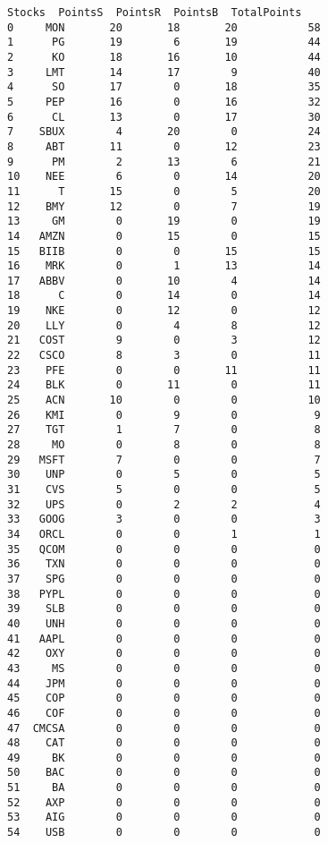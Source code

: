 \documentclass[11pt]{article}
\makeatletter
\newcommand{\boxspacing}{\kern\kvtcb@left@rule\kern\kvtcb@boxsep}
\newcommand{\prompt}[4]{
        {\ttfamily\llap{{\color{#2}[#3]:\hspace{3pt}#4}}\vspace{-\baselineskip}}
    }
\makeatother
\begin{document}
            \begin{tcolorbox}[breakable, size=fbox, boxrule=.5pt, pad at break*=1mm, opacityfill=0]
\prompt{Out}{outcolor}{31}{\boxspacing}
\begin{Verbatim}[commandchars=\\\{\}]
   Stocks  PointsS  PointsR  PointsB  TotalPoints
0     MON       20       18       20           58
1      PG       19        6       19           44
2      KO       18       16       10           44
3     LMT       14       17        9           40
4      SO       17        0       18           35
5     PEP       16        0       16           32
6      CL       13        0       17           30
7    SBUX        4       20        0           24
8     ABT       11        0       12           23
9      PM        2       13        6           21
10    NEE        6        0       14           20
11      T       15        0        5           20
12    BMY       12        0        7           19
13     GM        0       19        0           19
14   AMZN        0       15        0           15
15   BIIB        0        0       15           15
16    MRK        0        1       13           14
17   ABBV        0       10        4           14
18      C        0       14        0           14
19    NKE        0       12        0           12
20    LLY        0        4        8           12
21   COST        9        0        3           12
22   CSCO        8        3        0           11
23    PFE        0        0       11           11
24    BLK        0       11        0           11
25    ACN       10        0        0           10
26    KMI        0        9        0            9
27    TGT        1        7        0            8
28     MO        0        8        0            8
29   MSFT        7        0        0            7
30    UNP        0        5        0            5
31    CVS        5        0        0            5
32    UPS        0        2        2            4
33   GOOG        3        0        0            3
34   ORCL        0        0        1            1
35   QCOM        0        0        0            0
36    TXN        0        0        0            0
37    SPG        0        0        0            0
38   PYPL        0        0        0            0
39    SLB        0        0        0            0
40    UNH        0        0        0            0
41   AAPL        0        0        0            0
42    OXY        0        0        0            0
43     MS        0        0        0            0
44    JPM        0        0        0            0
45    COP        0        0        0            0
46    COF        0        0        0            0
47  CMCSA        0        0        0            0
48    CAT        0        0        0            0
49     BK        0        0        0            0
50    BAC        0        0        0            0
51     BA        0        0        0            0
52    AXP        0        0        0            0
53    AIG        0        0        0            0
54    USB        0        0        0            0
\end{Verbatim}
\end{tcolorbox}
        
\end{document}
